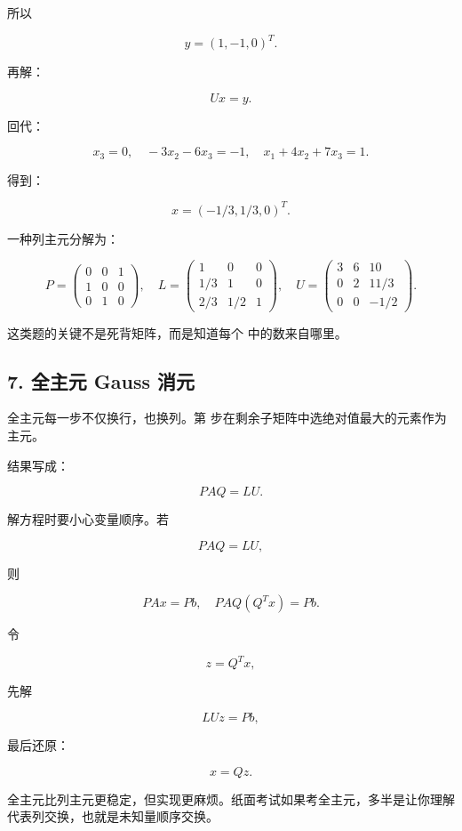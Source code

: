 \documentclass[11pt,a4paper]{ctexart}
\newcommand{\code}[1]{\begingroup\ttfamily\small #1\endgroup}
\begin{document}
所以

\[
y=(1,-1,0)^T.
\]

再解：

\[
Ux=y.
\]

回代：

\[
x_3=0,\quad -3x_2-6x_3=-1,\quad x_1+4x_2+7x_3=1.
\]

得到：

\[
x=(-1/3,1/3,0)^T.
\]

一种列主元分解为：

\[
P=\begin{pmatrix}0&0&1\\1&0&0\\0&1&0\end{pmatrix},
\quad
L=\begin{pmatrix}1&0&0\\1/3&1&0\\2/3&1/2&1\end{pmatrix},
\quad
U=\begin{pmatrix}3&6&10\\0&2&11/3\\0&0&-1/2\end{pmatrix}.
\]

这类题的关键不是死背矩阵，而是知道每个 \code{} 中的数来自哪里。


\subsection*{7. 全主元 Gauss 消元}


全主元每一步不仅换行，也换列。第 \code{} 步在剩余子矩阵中选绝对值最大的元素作为主元。

结果写成：

\[
PAQ=LU.
\]

解方程时要小心变量顺序。若

\[
PAQ=LU,
\]

则

\[
PAx=Pb,\quad PAQ(Q^Tx)=Pb.
\]

令

\[
z=Q^Tx,
\]

先解

\[
LUz=Pb,
\]

最后还原：

\[
x=Qz.
\]

全主元比列主元更稳定，但实现更麻烦。纸面考试如果考全主元，多半是让你理解 \code{} 代表列交换，也就是未知量顺序交换。
\end{document}
